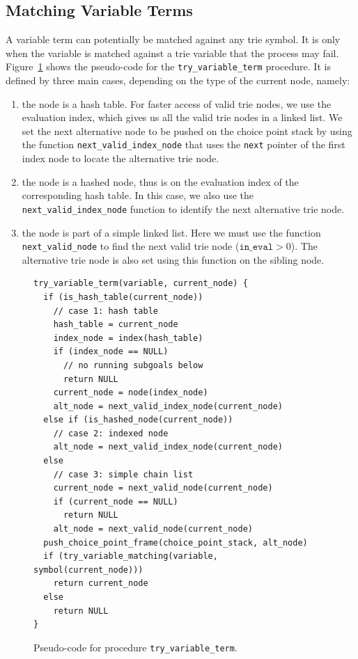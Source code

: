 \subsection{Matching Variable Terms}

A variable term can potentially be matched against any trie symbol. It
is only when the variable is matched against a trie variable that the
process may fail. Figure~\ref{fig:try_variable_term} shows the
pseudo-code for the \texttt{try\_variable\_term} procedure. It is defined
by three main cases, depending on the type of the current node, namely:

\begin{enumerate}
\item the node is a hash table. For faster access of valid trie  nodes, we use the evaluation index, which gives us all the valid
  trie nodes in a linked list. We set the next alternative node to be  pushed on the choice point stack by using the function
  \texttt{next\_valid\_index\_node} that uses the \texttt{next} pointer of the  first index node to locate the alternative trie node.
\item the node is a hashed node, thus is on the evaluation index of  the corresponding hash table. In this case, we also use the
  \texttt{next\_valid\_index\_node} function to identify the next
  alternative trie node.\item the node is part of a simple linked list. Here we must use the
  function \texttt{next\_valid\_node} to find the next valid trie node
  ($\texttt{in\_eval} > 0$). The alternative trie node is also set using this
  function on the sibling node.
\end{enumerate}

\begin{figure}[ht]
\begin{Verbatim}
try_variable_term(variable, current_node) {
  if (is_hash_table(current_node))
    // case 1: hash table
    hash_table = current_node
    index_node = index(hash_table)    
    if (index_node == NULL)
      // no running subgoals below
      return NULL    
    current_node = node(index_node)
    alt_node = next_valid_index_node(current_node)
  else if (is_hashed_node(current_node))
    // case 2: indexed node
    alt_node = next_valid_index_node(current_node)
  else
    // case 3: simple chain list
    current_node = next_valid_node(current_node)
    if (current_node == NULL)
      return NULL
    alt_node = next_valid_node(current_node)
  push_choice_point_frame(choice_point_stack, alt_node)
  if (try_variable_matching(variable, symbol(current_node)))
    return current_node
  else
    return NULL
}
\end{Verbatim}
\caption{Pseudo-code for procedure \texttt{try\_variable\_term}.}
\label{fig:try_variable_term}
\end{figure}

